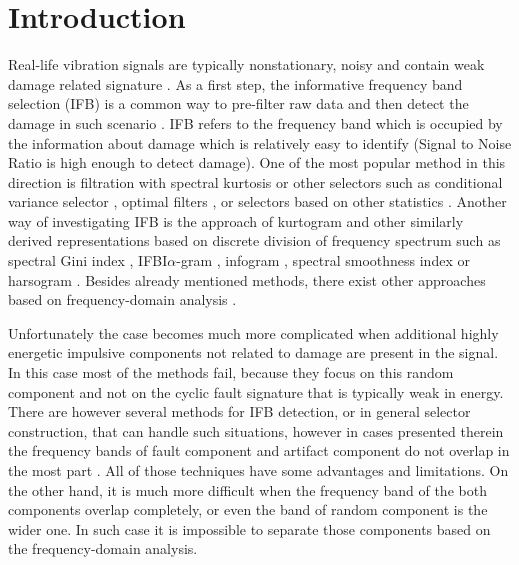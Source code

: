 \documentclass[3p,times]{elsarticle}
\begin{document}
\linenumbers

\section{Introduction}

Real-life vibration signals are typically nonstationary, noisy and contain weak damage related signature \cite{maheswari2017trends}. As a first step, the informative frequency band selection (IFB) is a common way to pre-filter raw data and then detect the damage in such scenario \cite{li2016fuzzy,jin2018informative}. IFB refers to the frequency band which is occupied by the information about damage which is relatively easy to identify (Signal to Noise Ratio is high enough to detect damage). One of the most popular method in this direction is filtration with spectral kurtosis \cite{antoni2006spectral,combet2009optimal} or other selectors such as conditional variance selector \cite{HebdaSobkowicz2020b}, optimal filters \cite{wodecki2018optimal}, or selectors based on other statistics \cite{obuchowski2014selection,zak2015application}. Another way of investigating IFB is the approach of kurtogram \cite{antoni2007fast} and other similarly derived representations based on discrete division of frequency spectrum \cite{HebdaSobkowicz2020b,wang2018some} such as spectral Gini index \cite{miao2017improvement_GINI}, IFBI$\alpha$-gram \cite{schmidt2020methodology}, infogram \cite{antoni2016info}, spectral smoothness index \cite{bozchalooi2007smoothness} or harsogram \cite{zhao2016detection}. Besides already mentioned methods, there exist other approaches based on frequency-domain analysis \cite{dybala2018diagnosing,obuchowski2016blind,zhang2015novel}.


Unfortunately the case becomes much more complicated when additional highly energetic impulsive components not related to damage are present in the signal. In this case most of the methods fail, because they focus on this random component and not on the cyclic fault signature that is typically weak in energy. There are however several methods for IFB detection, or in general selector construction, that can handle such situations, however in cases presented therein the frequency bands of fault component and artifact component do not overlap in the most part \cite{HebdaSobkowicz2020b,zak2015application,miao2017improvement_GINI,antoni2016info,Borghesani2017}. 
All of those techniques have some advantages and limitations. On the other hand, it is much more difficult when the frequency band of the both components overlap completely, or even the band of random component is the wider one. In such case it is impossible to separate those components based on the frequency-domain analysis.
 
\end{document}
